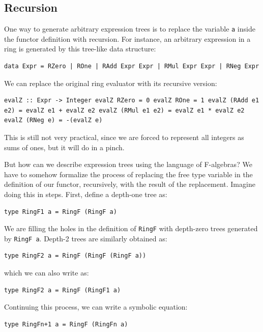 \subsection{Recursion}\label{recursion}

One way to generate arbitrary expression trees is to replace the
variable \texttt{a} inside the functor definition with recursion. For
instance, an arbitrary expression in a ring is generated by this
tree-like data structure:

\begin{verbatim}
data Expr = RZero | ROne | RAdd Expr Expr | RMul Expr Expr | RNeg Expr
\end{verbatim}

We can replace the original ring evaluator with its recursive version:

\begin{verbatim}
evalZ :: Expr -> Integer evalZ RZero = 0 evalZ ROne = 1 evalZ (RAdd e1 e2) = evalZ e1 + evalZ e2 evalZ (RMul e1 e2) = evalZ e1 * evalZ e2 evalZ (RNeg e) = -(evalZ e)
\end{verbatim}

This is still not very practical, since we are forced to represent all
integers as sums of ones, but it will do in a pinch.

But how can we describe expression trees using the language of
F-algebras? We have to somehow formalize the process of replacing the
free type variable in the definition of our functor, recursively, with
the result of the replacement. Imagine doing this in steps. First,
define a depth-one tree as:

\begin{verbatim}
type RingF1 a = RingF (RingF a)
\end{verbatim}

We are filling the holes in the definition of \texttt{RingF} with
depth-zero trees generated by \texttt{RingF\ a}. Depth-2 trees are
similarly obtained as:

\begin{verbatim}
type RingF2 a = RingF (RingF (RingF a))
\end{verbatim}

which we can also write as:

\begin{verbatim}
type RingF2 a = RingF (RingF1 a)
\end{verbatim}

Continuing this process, we can write a symbolic equation:

\begin{verbatim}
type RingFn+1 a = RingF (RingFn a)
\end{verbatim}


